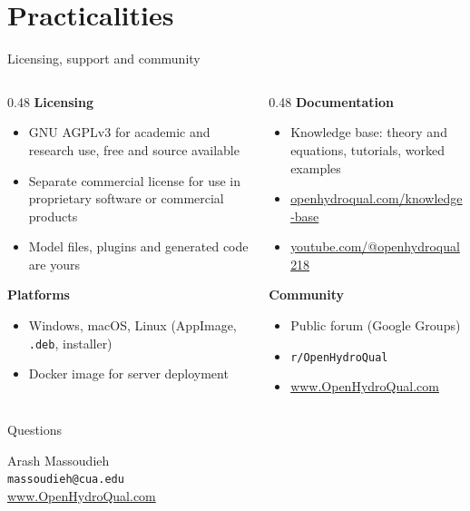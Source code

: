 \documentclass[aspectratio=169, 10pt]{beamer}
\begin{document}
\section{Practicalities}

\begin{frame}{Licensing, support and community}
  \begin{columns}[T,onlytextwidth]
    \begin{column}{0.48\textwidth}
      \textbf{Licensing}
      \begin{itemize}\setlength\itemsep{2pt}
        \item \alert{GNU AGPLv3} for academic and research use, free and
              source available
        \item Separate \alert{commercial license} for use in proprietary
              software or commercial products
        \item Model files, plugins and generated code are yours
      \end{itemize}
      \vspace{0.6em}
      \textbf{Platforms}
      \begin{itemize}\setlength\itemsep{2pt}
        \item Windows, macOS, Linux (AppImage, \texttt{.deb}, installer)
        \item Docker image for server deployment
      \end{itemize}
    \end{column}
    \begin{column}{0.48\textwidth}
      \textbf{Documentation}
      \begin{itemize}\setlength\itemsep{2pt}
        \item Knowledge base: theory and equations, tutorials, worked examples
        \item \url{openhydroqual.com/knowledge-base}
        \item \url{youtube.com/@openhydroqual218}
      \end{itemize}
      \vspace{0.6em}
      \textbf{Community}
      \begin{itemize}\setlength\itemsep{2pt}
        \item Public forum (Google Groups)
        \item \texttt{r/OpenHydroQual}
        \item \url{www.OpenHydroQual.com}
      \end{itemize}
    \end{column}
  \end{columns}
\end{frame}

\begin{frame}[standout]
  Questions
  \vspace{0.8em}

  {\normalsize
  Arash Massoudieh\\
  \texttt{massoudieh@cua.edu}\\
  \url{www.OpenHydroQual.com}}
\end{frame}
\end{document}
